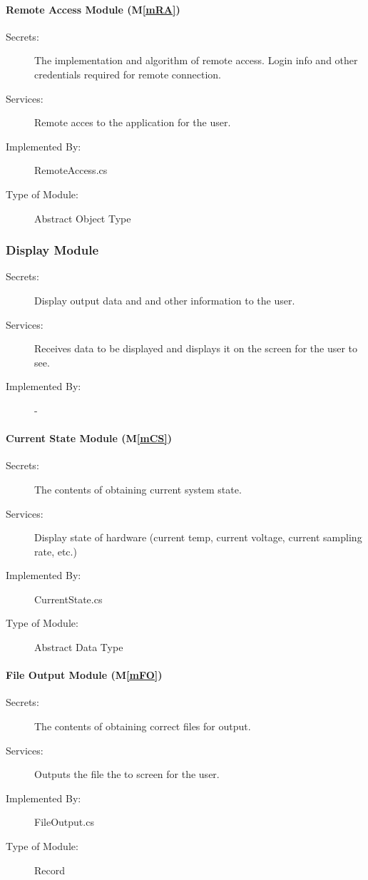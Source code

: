 \documentclass[12pt, titlepage]{article}
\newcommand{\mref}[1]{M\ref{#1}}
\begin{document}
\paragraph{Remote Access Module (\mref{mRA})}
\begin{description}
\item[Secrets:]The implementation and algorithm of remote access. Login info and other credentials required for remote connection.
\item[Services:]Remote acces to the application for the user.
\item[Implemented By:] RemoteAccess.cs
\item[Type of Module:] Abstract Object Type
\end{description}

\subsubsection{Display Module}
\begin{description}
  \item[Secrets:] Display output data and and other information to the user.
  \item[Services:]Receives data to be displayed and displays it on the screen for the user to see. 
  \item[Implemented By:] -
\end{description}

\paragraph{Current State Module (\mref{mCS})}
\begin{description}
\item[Secrets:]The contents of obtaining current system state.
\item[Services:]Display state of hardware (current temp, current voltage, current sampling rate, etc.)
\item[Implemented By:] CurrentState.cs
\item[Type of Module:] Abstract Data Type
\end{description}

\paragraph{File Output Module (\mref{mFO})}
\begin{description}
\item[Secrets:]The contents of obtaining correct files for output.
\item[Services:]Outputs the file the to screen for the user. 
\item[Implemented By:] FileOutput.cs
\item[Type of Module:] Record
\end{description}
\end{document}
